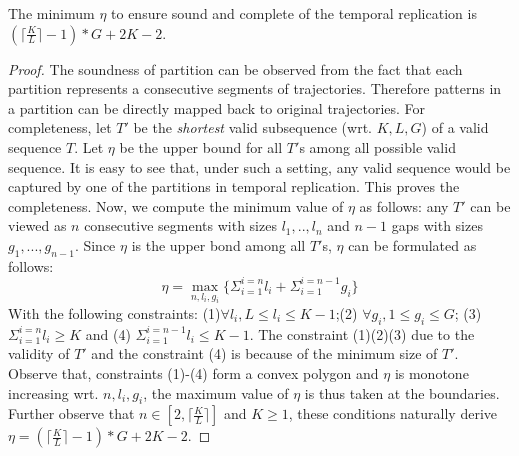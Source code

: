 \begin{theorem}
\label{thm:replication_partition}
The minimum $\eta$ to ensure sound and complete of the temporal replication 
is $(\lceil \frac{K}{L} \rceil -1)*G+2K -2$.
\end{theorem}
\begin{proof}
The soundness of partition can be observed from the fact 
that each partition represents a consecutive segments of trajectories. 
Therefore patterns in a partition can be directly mapped 
back to original trajectories. 
For completeness, let $T'$ be the \emph{shortest} valid subsequence (wrt. $K,L,G$) 
of a valid sequence $T$. Let $\eta$ be the upper bound for all $T'$s among 
all possible valid sequence. It is easy to see that, under such a setting,
any valid sequence would be captured by one of the partitions in temporal
replication. This proves the completeness. Now, we compute the minimum value
of $\eta$ as follows:
any $T'$ can be viewed as $n$ consecutive segments with sizes $l_1,..,l_n$
and $n-1$ gaps with sizes $g_1,...,g_{n-1}$. Since $\eta$ is the upper bond among all $T'$s, $\eta$ can be formulated 
as follows:
\begin{equation}
\eta = \max_{n,l_i,g_i} \{ \Sigma_{i=1}^{i=n} l_i + \Sigma_{i=1}^{i=n-1} g_i \}
\end{equation}
With the following constraints: (1)$\forall l_i, L \leq l_i \leq K-1$;(2)
$\forall g_i, 1 \leq g_i \leq G$; (3) $\Sigma_{i=1}^{i=n} l_i \geq K$ and
(4) $\Sigma_{i=1}^{i=n-1}l_i  \leq K-1$. The constraint (1)(2)(3) due to the 
validity of $T'$ and the constraint (4) is because of the minimum size of $T'$.
Observe that, constraints (1)-(4) form a convex polygon and $\eta$ is monotone
increasing wrt. $n,l_i,g_i$, the maximum value of $\eta$ is thus taken at the boundaries. Further
observe that $n \in [2, \lceil \frac{K}{L} \rceil]$ and $K \geq 1$, these
conditions naturally derive
$\eta = (\lceil \frac{K}{L} \rceil -1)*G+2K -2$.
\end{proof}

